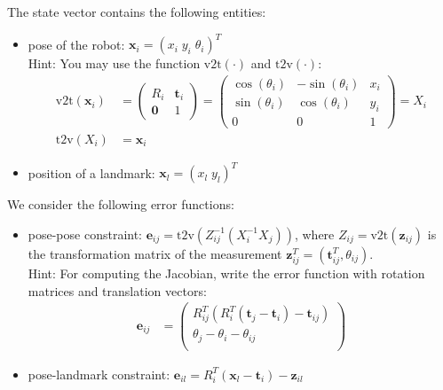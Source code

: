 \documentclass[12pt]{article}
\begin{document}
The state vector contains the following entities:
\begin{itemize}
  \item pose of the robot: $\mathbf{x}_i = (x_i \; y_i \; \theta_i)^T$\\
    Hint: You may use the function $\mathrm{v2t}(\cdot)$ and
    $\mathrm{t2v}(\cdot)$:
    \begin{align*}
    \mathrm{v2t}(\mathbf{x}_i) &= 
    \begin{pmatrix}
      R_i &\mathbf{t}_i\\
      \mathbf{0} & 1
    \end{pmatrix}
    =
    \begin{pmatrix}
      \cos(\theta_i) & -\sin(\theta_i) & x_i\\
      \sin(\theta_i) & \cos(\theta_i) & y_i\\
      0 & 0 & 1
    \end{pmatrix}
    = X_i\\
    \mathrm{t2v}(X_i) &= \mathbf{x}_i
    \end{align*}
  \item position of a landmark: $\mathbf{x}_l = (x_l \; y_l)^T$
\end{itemize}

We consider the following error functions:
\begin{itemize}
  \item pose-pose constraint:
    $\mathbf{e}_\mathit{ij} = \mathrm{t2v}(Z^{-1}_\mathit{ij} (X_i^{-1}
    X_j))$, where $Z_\mathit{ij} = \mathrm{v2t}(\mathbf{z}_\mathit{ij})$
    is the transformation matrix of the measurement $\mathbf{z}_{ij}^T =
    (\mathbf{t}_{ij}^T, \theta_{ij})$.\\
    Hint: For computing the Jacobian, write the error function with
    rotation matrices and translation vectors:
    \begin{align*}
      \mathbf{e}_\mathit{ij} &=
      \begin{pmatrix}
        R_{ij}^T (R_i^T(\mathbf{t}_j-\mathbf{t}_i)-\mathbf{t}_{ij})\\
        \theta_j -\theta_i - \theta_{ij}\\
      \end{pmatrix}
    \end{align*}
  \item pose-landmark constraint:
    $\mathbf{e}_\mathit{il} = R_i^T (\mathbf{x}_l - \mathbf{t}_i) -
    \mathbf{z}_{il}$
\end{itemize}
\end{document}
